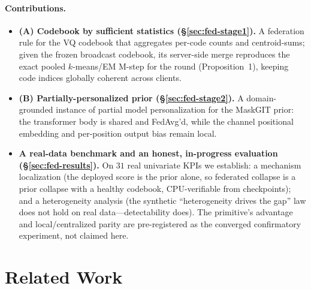 \documentclass[11pt]{article}
\theoremstyle{plain}
\theoremstyle{definition}
\begin{document}
\paragraph{Contributions.}
\begin{itemize}
  \item \textbf{(A) Codebook by sufficient statistics (\S\ref{sec:fed-stage1}).} A
  federation rule for the VQ codebook that aggregates per-code counts and
  centroid-sums; given the frozen broadcast codebook, its server-side merge
  reproduces the exact pooled $k$-means/EM M-step for the round (Proposition~1),
  keeping code indices globally coherent across clients.
  \item \textbf{(B) Partially-personalized prior (\S\ref{sec:fed-stage2}).} A
  domain-grounded instance of partial model personalization for the MaskGIT prior:
  the transformer body is shared and FedAvg'd, while the channel positional
  embedding and per-position output bias remain local.
  \item \textbf{A real-data benchmark and an honest, in-progress evaluation
  (\S\ref{sec:fed-results}).} On $31$ real univariate KPIs we establish:
  a mechanism localization (the deployed score is the prior alone, so federated collapse
  is a prior collapse with a healthy codebook, CPU-verifiable from checkpoints); and a
  heterogeneity analysis (the synthetic ``heterogeneity drives the gap'' law does not hold
  on real data---detectability does). The primitive's advantage and local/centralized
  parity are pre-registered as the converged confirmatory experiment, not claimed here.
\end{itemize}

\section{Related Work}
\label{sec:related-work}
\end{document}
